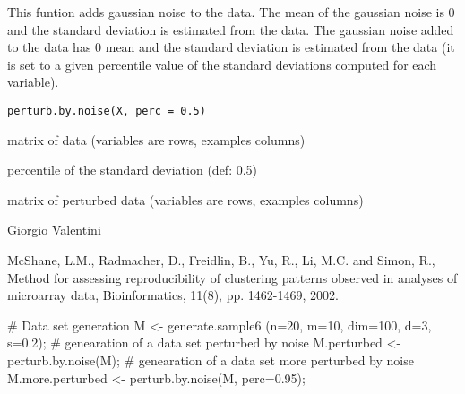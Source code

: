 \documentclass{article}
\begin{document}
\begin{Description}\relax
This funtion adds gaussian noise to the data. The mean of the gaussian noise is 0 and the standard deviation is estimated from the data.
The gaussian noise  added to the data has 0 mean and the standard deviation is estimated from the data (it is 
set to a given percentile value of the standard deviations computed for each variable).
\end{Description}
\begin{Usage}
\begin{verbatim}
perturb.by.noise(X, perc = 0.5)
\end{verbatim}
\end{Usage}
\begin{Arguments}
\begin{ldescription}
\item[\code{X}] matrix of data (variables are rows, examples columns) 
\item[\code{perc}] percentile of the standard deviation (def: 0.5) 
\end{ldescription}
\end{Arguments}
\begin{Value}
matrix of perturbed data (variables are rows, examples columns)
\end{Value}
\begin{Author}\relax
Giorgio Valentini 
\end{Author}
\begin{References}\relax
McShane, L.M., Radmacher, D., Freidlin, B., Yu, R.,  Li, M.C. and Simon, R.,
Method for assessing reproducibility of clustering patterns observed in analyses of microarray data,
Bioinformatics, 11(8), pp. 1462-1469, 2002.
\end{References}
\begin{SeeAlso}\relax
{}
\end{SeeAlso}
\begin{Examples}
\begin{ExampleCode}
# Data set generation
M <- generate.sample6 (n=20, m=10, dim=100, d=3, s=0.2);
# genearation of a data set perturbed by noise
M.perturbed <- perturb.by.noise(M);
# genearation of a data set more perturbed by noise
M.more.perturbed <- perturb.by.noise(M, perc=0.95);
\end{ExampleCode}
\end{Examples}
\end{document}
